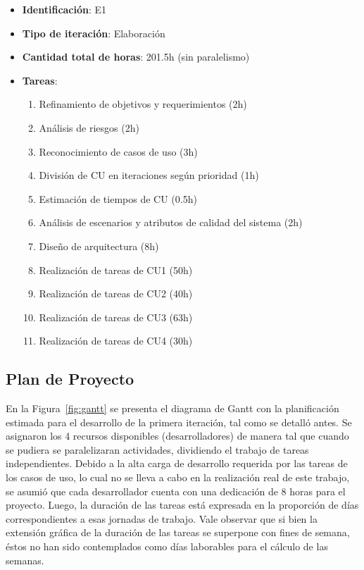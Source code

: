 \begin{itemize}
\item \textbf{Identificación}: E1
\item \textbf{Tipo de iteración}: Elaboración
\item \textbf{Cantidad total de horas}: 201.5h (sin paralelismo)
\item \textbf{Tareas}:
	\begin{enumerate}
	\item Refinamiento de objetivos y requerimientos (2h)
	\item Análisis de riesgos (2h)
	\item Reconocimiento de casos de uso (3h)
	\item División de CU en iteraciones según prioridad (1h)
	\item Estimación de tiempos de CU (0.5h)
	\item Análisis de escenarios y atributos de calidad del sistema (2h)
	\item Diseño de arquitectura (8h)
	\item Realización de tareas de CU1 (50h)
	\item Realización de tareas de CU2 (40h)
	\item Realización de tareas de CU3 (63h)
	\item Realización de tareas de CU4 (30h)
	\end{enumerate}
\end{itemize}

\subsection{Plan de Proyecto}

En la Figura~\ref{fig:gantt} se presenta el diagrama de Gantt con la planificación estimada para el desarrollo de la primera iteración, tal como se detalló antes. Se asignaron los 4 recursos disponibles (desarrolladores) de manera tal que cuando se pudiera se paralelizaran actividades, dividiendo el trabajo de tareas independientes. Debido a la alta carga de desarrollo requerida por las tareas de los casos de uso, lo cual no se lleva a cabo en la realización real de este trabajo, se asumió que cada desarrollador cuenta con una dedicación de 8 horas para el proyecto. Luego, la duración de las tareas está expresada en la proporción de días correspondientes a esas jornadas de trabajo. Vale observar que si bien la extensión gráfica de la duración de las tareas se superpone con fines de semana, éstos no han sido contemplados como días laborables para el cálculo de las semanas.


